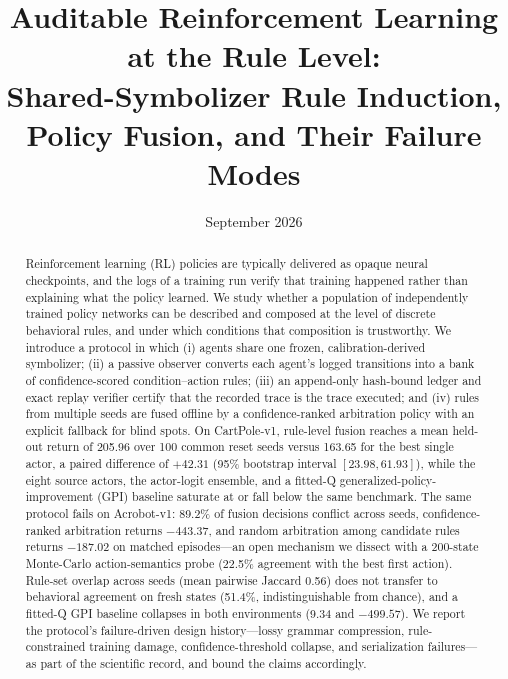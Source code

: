 \documentclass[11pt]{article}
\title{\vspace{-1.2em}Auditable Reinforcement Learning at the Rule Level:\\ Shared-Symbolizer Rule Induction, Policy Fusion, and Their Failure Modes\vspace{-0.6em}}
\date{September 2026}
\begin{document}
\maketitle

\begin{abstract}
Reinforcement learning (RL) policies are typically delivered as opaque neural
checkpoints, and the logs of a training run verify that training happened rather than
explaining what the policy learned. We study whether a population of independently trained policy
networks can be described and composed at the level of discrete behavioral rules, and under which
conditions that composition is trustworthy. We introduce a protocol in which (i) agents share one
frozen, calibration-derived symbolizer; (ii) a passive observer converts each agent's logged
transitions into a bank of confidence-scored condition--action rules; (iii) an append-only hash-bound
ledger and exact replay verifier certify that the recorded trace is the trace executed; and (iv) rules
from multiple seeds are fused offline by a confidence-ranked arbitration policy with an explicit
fallback for blind spots. On CartPole-v1, rule-level fusion reaches a mean held-out return of 205.96
over 100 common reset seeds versus 163.65 for the best single actor, a paired difference of $+42.31$
(95\% bootstrap interval $[23.98,61.93]$), while the eight source actors, the actor-logit ensemble,
and a fitted-Q generalized-policy-improvement (GPI) baseline saturate at or fall below the same
benchmark. The same protocol fails on Acrobot-v1: 89.2\% of fusion decisions conflict across seeds,
confidence-ranked arbitration returns $-443.37$, and random arbitration among candidate rules returns
$-187.02$ on matched episodes---an open mechanism we dissect with a 200-state Monte-Carlo
action-semantics probe (22.5\% agreement with the best first action). Rule-set overlap across seeds
(mean pairwise Jaccard 0.56) does not transfer to behavioral agreement on fresh states (51.4\%,
indistinguishable from chance), and a fitted-Q GPI baseline collapses in both environments (9.34 and
$-499.57$). We report the protocol's failure-driven design history---lossy grammar compression,
rule-constrained training damage, confidence-threshold collapse, and serialization failures---as part
of the scientific record, and bound the claims accordingly.
\end{abstract}

\end{document}

